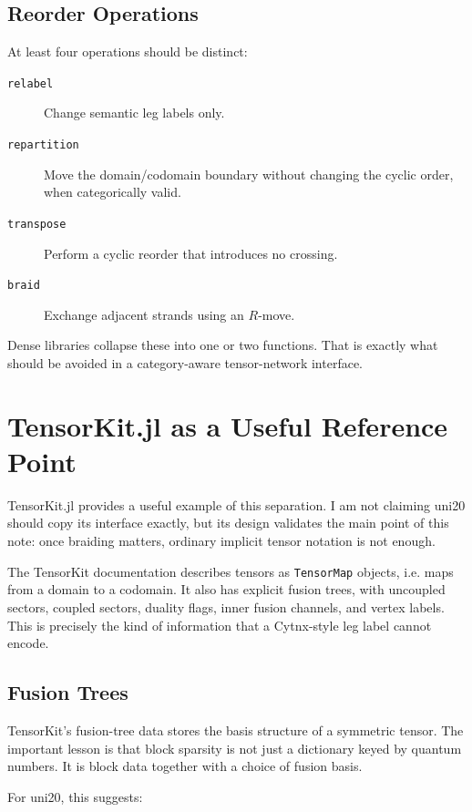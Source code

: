 \documentclass[11pt]{article}
\begin{document}
\subsection{Reorder Operations}

At least four operations should be distinct:

\begin{description}
  \item[\texttt{relabel}] Change semantic leg labels only.
  \item[\texttt{repartition}] Move the domain/codomain boundary without
        changing the cyclic order, when categorically valid.
  \item[\texttt{transpose}] Perform a cyclic reorder that introduces no
        crossing.
  \item[\texttt{braid}] Exchange adjacent strands using an \(R\)-move.
\end{description}

Dense libraries collapse these into one or two functions.  That is
exactly what should be avoided in a category-aware tensor-network
interface.

\section{TensorKit.jl as a Useful Reference Point}

TensorKit.jl provides a useful example of this separation.  I am not
claiming uni20 should copy its interface exactly, but its design
validates the main point of this note: once braiding matters, ordinary
implicit tensor notation is not enough.

The TensorKit documentation describes tensors as \texttt{TensorMap}
objects, i.e. maps from a domain to a codomain.  It also has explicit
fusion trees, with uncoupled sectors, coupled sectors, duality flags,
inner fusion channels, and vertex labels.  This is precisely the kind
of information that a Cytnx-style leg label cannot encode.

\subsection{Fusion Trees}

TensorKit's fusion-tree data stores the basis structure of a symmetric
tensor.  The important lesson is that block sparsity is not just a
dictionary keyed by quantum numbers.  It is block data together with a
choice of fusion basis.

For uni20, this suggests:
\end{document}

